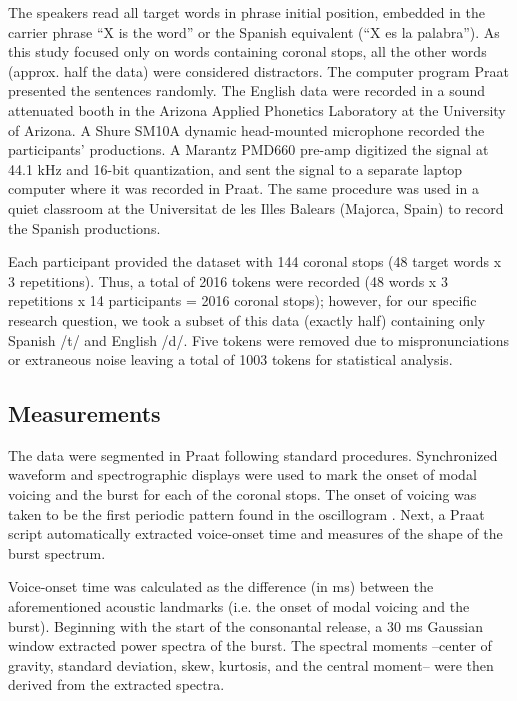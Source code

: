 \documentclass[a4paper,10pt,twocolumn]{article}\usepackage[]{graphicx}\usepackage[]{color}
\begin{document}
	\vspace{.1in}
	

	The speakers read all target words in phrase initial position, embedded in the carrier phrase ``X is the word'' or the Spanish equivalent (``X es la palabra''). As this study focused only on words containing coronal stops, all the other words (approx. half the data) were considered distractors. The computer program Praat \cite{Praat} presented the sentences randomly. The English data were recorded in a sound attenuated booth in the Arizona Applied Phonetics Laboratory at the University of Arizona. A Shure SM10A dynamic head-mounted microphone recorded the participants' productions. A Marantz PMD660 pre-amp digitized the signal at 44.1 kHz and 16-bit quantization, and sent the signal to a separate laptop computer where it was recorded in Praat. The same procedure was used in a quiet classroom at the Universitat de les Illes Balears (Majorca, Spain) to record the Spanish productions.

	Each participant provided the dataset with 144 coronal stops (48 target words x 3 repetitions). Thus, a total of 2016 tokens were recorded (48 words x 3 repetitions x 14 participants = 2016 coronal stops); however, for our specific research question, we took a subset of this data (exactly half) containing only Spanish /t/ and English /d/. Five tokens were removed due to mispronunciations or extraneous noise leaving a total of 1003 tokens for statistical analysis. 


	\subsection{Measurements} %
	\label{sub:measurements}
	
	The data were segmented in Praat following standard procedures. Synchronized waveform and spectrographic displays were used to mark the onset of modal voicing and the burst for each of the coronal stops. The onset of voicing was taken to be the first periodic pattern found in the oscillogram \cite{lieberman1988speech}. Next, a Praat script automatically extracted voice-onset time and measures of the shape of the burst spectrum.

	Voice-onset time was calculated as the difference (in ms) between the aforementioned acoustic landmarks (i.e. the onset of modal voicing and the burst). Beginning with the start of the consonantal release, a 30 ms Gaussian window extracted power spectra of the burst. The spectral moments --center of gravity, standard deviation, skew, kurtosis, and the central moment-- were then derived from the extracted spectra. 
\end{document}
